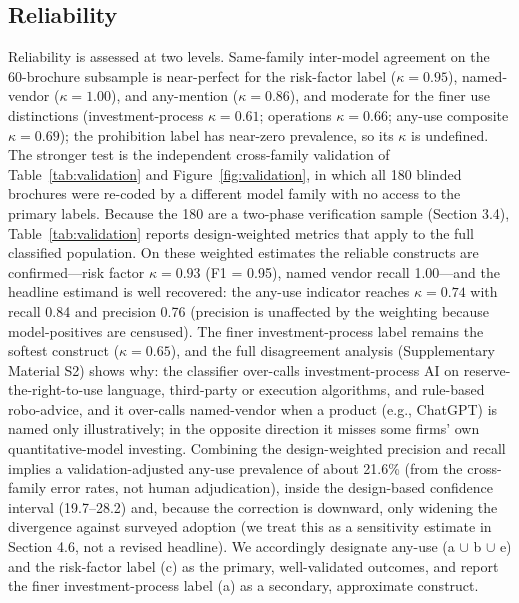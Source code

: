 \documentclass[utf8]{FrontiersinHarvard}
\begin{document}
\subsection{Reliability}
Reliability is assessed at two levels. Same-family inter-model agreement on the 60-brochure subsample is near-perfect for the risk-factor label ($\kappa = 0.95$), named-vendor ($\kappa = 1.00$), and any-mention ($\kappa = 0.86$), and moderate for the finer use distinctions (investment-process $\kappa = 0.61$; operations $\kappa = 0.66$; any-use composite $\kappa = 0.69$); the prohibition label has near-zero prevalence, so its $\kappa$ is undefined. The stronger test is the independent cross-family validation of Table~\ref{tab:validation} and Figure~\ref{fig:validation}, in which all 180 blinded brochures were re-coded by a different model family with no access to the primary labels. Because the 180 are a two-phase verification sample (Section 3.4), Table~\ref{tab:validation} reports design-weighted metrics that apply to the full classified population. On these weighted estimates the reliable constructs are confirmed---risk factor $\kappa = 0.93$ (F1 = 0.95), named vendor recall 1.00---and the headline estimand is well recovered: the any-use indicator reaches $\kappa = 0.74$ with recall 0.84 and precision 0.76 (precision is unaffected by the weighting because model-positives are censused). The finer investment-process label remains the softest construct ($\kappa = 0.65$), and the full disagreement analysis (Supplementary Material S2) shows why: the classifier over-calls investment-process AI on reserve-the-right-to-use language, third-party or execution algorithms, and rule-based robo-advice, and it over-calls named-vendor when a product (e.g., ChatGPT) is named only illustratively; in the opposite direction it misses some firms' own quantitative-model investing. Combining the design-weighted precision and recall implies a validation-adjusted any-use prevalence of about 21.6\% (from the cross-family error rates, not human adjudication), inside the design-based confidence interval (19.7--28.2) and, because the correction is downward, only widening the divergence against surveyed adoption (we treat this as a sensitivity estimate in Section 4.6, not a revised headline). We accordingly designate any-use (a $\cup$ b $\cup$ e) and the risk-factor label (c) as the primary, well-validated outcomes, and report the finer investment-process label (a) as a secondary, approximate construct.
\end{document}
